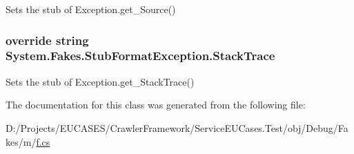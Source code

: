 Sets the stub of Exception.\-get\-\_\-\-Source()

\hypertarget{class_system_1_1_fakes_1_1_stub_format_exception_a38244a4106cedc5f3d0c2fdb23a0cd0b}{
\subsubsection[{Stack\-Trace}]{\setlength{\rightskip}{0pt plus 5cm}override string System.\-Fakes.\-Stub\-Format\-Exception.\-Stack\-Trace\hspace{0.3cm}{\ttfamily [get]}}}\label{class_system_1_1_fakes_1_1_stub_format_exception_a38244a4106cedc5f3d0c2fdb23a0cd0b}


Sets the stub of Exception.\-get\-\_\-\-Stack\-Trace()



The documentation for this class was generated from the following file\-:\begin{DoxyCompactItemize}
\item 
D\-:/\-Projects/\-E\-U\-C\-A\-S\-E\-S/\-Crawler\-Framework/\-Service\-E\-U\-Cases.\-Test/obj/\-Debug/\-Fakes/m/\hyperlink{m_2f_8cs}{f.\-cs}\end{DoxyCompactItemize}

